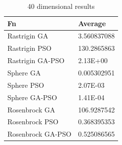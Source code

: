 \documentclass[runningheads]{llncs}
\begin{document}
      \begin{table}[htp]
        \caption{40 dimensional results}
        \label{table:resultados-2}
        \centering
        \begin{tabular}{|l|l|}
        \hline
        Fn  & Average\\
        \hline
        \hline
        Rastrigin GA & 3.560837088\\
        \hline
        Rastrigin PSO & 130.2865863\\
        \hline
        Rastrigin GA-PSO & 2.13E+00\\
        \hline
        Sphere GA  & 0.005302951\\
        \hline
        Sphere PSO  & 2.07E-03\\
        \hline
        Sphere GA-PSO  & 1.41E-04\\
        \hline
        Rosenbrock GA & 106.9287542\\
        \hline
        Rosenbrock PSO & 0.368395353\\
        \hline
        Rosenbrock GA-PSO & 0.525086565\\
        \hline
        \end{tabular}
      \end{table}
\end{document}
